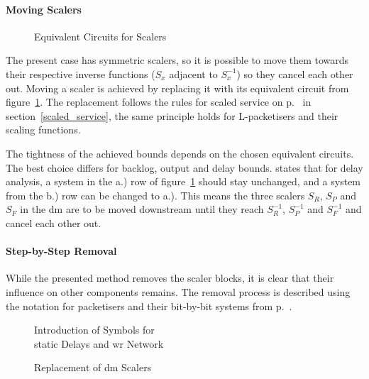 \paragraph{Moving Scalers}

\begin{figure}[H]
  \centering
  \def\svgwidth{0.8\textwidth}
  
  \caption{Equivalent Circuits for Scalers}
  \label{fig:scaler_order}
\end{figure}
\noindent
The present case has symmetric scalers, so it is possible to move them towards their respective inverse functions ($S_x$ adjacent to $S^{-1}_x$)
so they cancel each other out.
Moving a scaler is achieved by replacing it with its equivalent circuit from figure~\ref{fig:scaler_order}.
The replacement follows the rules for scaled service on p.~\pageref{scaled_service} in section~\ref{scaled_service},
the same principle holds for L-packetisers and their scaling functions.
\par
The tightness of the achieved bounds depends on the chosen equivalent circuits. The best choice differs for
backlog, output and delay bounds.
\cite[p. 294 (8)]{fidler_way_2006} states that for delay analysis, a system in the a.) row of figure~\ref{fig:scaler_order} should stay unchanged,
and a system from the b.) row can be changed to a.). This means the three scalers $S_R$, $S_P$ and $S_F$ in the \gls{dm} are to be moved downstream
until they reach  $S^{-1}_R$, $S^{-1}_P$ and $S^{-1}_F$ and cancel each other out.


\paragraph{Step-by-Step Removal}
While the presented method removes the scaler blocks, it is clear that their influence on other components remains.
The removal process is described using the notation for packetisers and their bit-by-bit systems from p.~\pageref{sec:e2e_da}.

\begin{figure}[H]
  \centering
  \def\svgwidth{0.95\textheight}
   \vspace*{-10mm}
 \hspace*{-10mm}
  \caption{Introduction of Symbols for\\static Delays and \gls{wr} Network}
  \label{fig:block2}
\end{figure}

\begin{figure}[H]
  \centering
  \def\svgwidth{0.95\textheight}
  \vspace*{-10mm}
 \hspace*{-10mm}
  \caption{Replacement of \gls{dm} Scalers}
  \label{fig:block3}
\end{figure}

